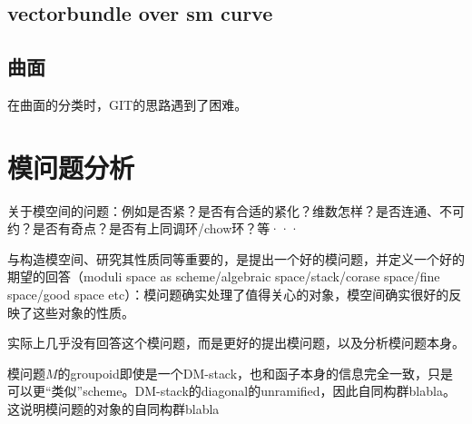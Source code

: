 \subsection{vectorbundle over sm curve}

\subsection{曲面}
在曲面的分类时，GIT的思路遇到了困难。



\section{模问题分析}

关于模空间的问题：例如是否紧？是否有合适的紧化？维数怎样？是否连通、不可约？是否有奇点？是否有上同调环/chow环？等···

与构造模空间、研究其性质同等重要的，是提出一个好的模问题，并定义一个好的期望的回答（moduli space as scheme/algebraic space/stack/corase space/fine space/good space etc）：模问题确实处理了值得关心的对象，模空间确实很好的反映了这些对象的性质。

实际上几乎没有回答这个模问题，而是更好的提出模问题，以及分析模问题本身。

模问题$ M $的groupoid即使是一个DM-stack，也和函子本身的信息完全一致，只是可以更“类似”scheme。DM-stack的diagonal的unramified，因此自同构群blabla。这说明模问题的对象的自同构群blabla


